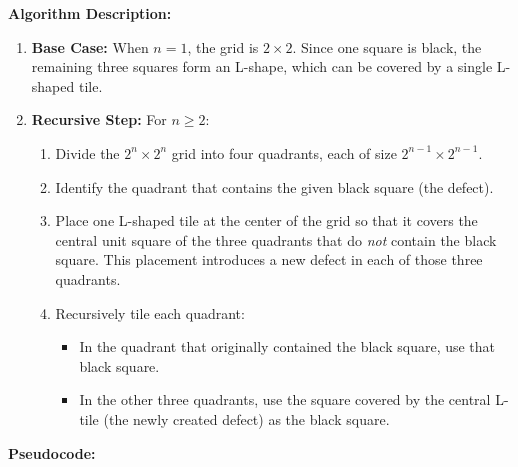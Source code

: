 \documentclass[11pt]{article}
\begin{document}
    \textbf{Algorithm Description:} \\
    \begin{enumerate}
        \item \textbf{Base Case:} When \( n = 1 \), the grid is \( 2 \times 2 \). Since one square is black, the remaining three squares form an L-shape, which can be covered by a single L-shaped tile.
        \item \textbf{Recursive Step:} For \( n \ge 2 \):
        \begin{enumerate}
            \item Divide the \( 2^n \times 2^n \) grid into four quadrants, each of size \( 2^{n-1} \times 2^{n-1} \).
            \item Identify the quadrant that contains the given black square (the defect).
            \item Place one L-shaped tile at the center of the grid so that it covers the central unit square of the three quadrants that do \emph{not} contain the black square. This placement introduces a new defect in each of those three quadrants.
            \item Recursively tile each quadrant:
                \begin{itemize}
                    \item In the quadrant that originally contained the black square, use that black square.
                    \item In the other three quadrants, use the square covered by the central L-tile (the newly created defect) as the black square.
                \end{itemize}
        \end{enumerate}
    \end{enumerate}
    
    \bigskip
    
    \textbf{Pseudocode:}
    
\end{document}
